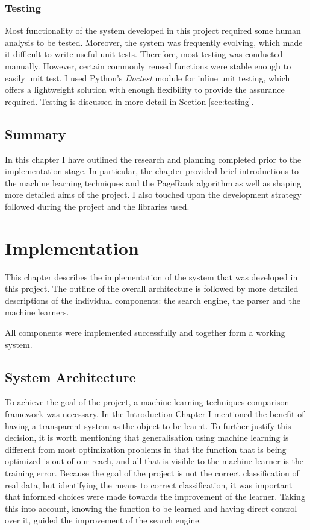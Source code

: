 \documentclass[12pt,a4paper,notitlepage,twoside]{scrbook}
\begin{document}
\subsection{Testing}
Most functionality of the system developed in this project required some human analysis to
be tested. Moreover, the system was frequently evolving, which made it difficult to write
useful unit tests. Therefore, most testing was conducted manually. However, certain
commonly reused functions were stable enough to easily unit test. I used Python's
\textit{Doctest} module for inline unit testing, which offers a lightweight solution
with enough flexibility to provide the assurance required. Testing is discussed in more
detail in Section \ref{sec:testing}.
\section{Summary}
In this chapter I have outlined the research and planning completed prior to the
implementation stage. In particular, the chapter provided brief introductions to the machine
learning techniques and the PageRank algorithm as well as shaping more detailed aims of
the project. I also touched upon the development strategy followed during the project 
and the libraries used.


\chapter{Implementation}
This chapter describes the implementation of the system that was developed in this
project. The outline of the overall architecture is followed by more detailed descriptions
of the individual components: the search engine, the parser and the machine learners.

All components were implemented successfully and together form a working system.
\section{System Architecture}

To achieve the goal of the project, a machine learning techniques comparison framework was
necessary. In the Introduction Chapter I mentioned the benefit of having a transparent
system as the object to be learnt. To further justify this decision, it is worth mentioning
that generalisation using machine learning is different from most optimization problems in
that the function that is being optimized is out of our reach, and all that is visible to
the machine learner is the training error. Because the goal of the project is not the
correct classification of real data, but identifying the means to correct classification,
it was important that informed choices were made towards the improvement of the learner.
Taking this into account, knowing the function to be learned and having direct control
over it, guided the improvement of the search engine. 
\end{document}
